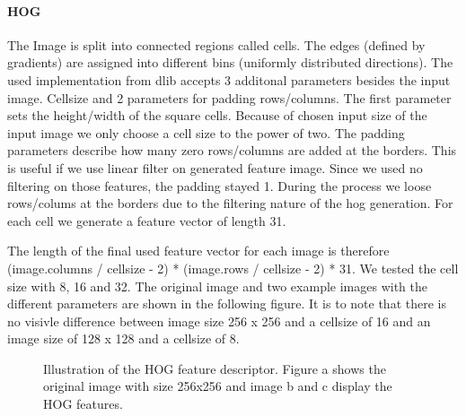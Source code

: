 \documentclass[a4paper,10pt]{article}
\begin{document}
\paragraph{HOG} 
The Image is split into connected regions called cells. The edges (defined by gradients) are assigned into different bins (uniformly distributed directions).
The used implementation from dlib accepts 3 additonal parameters besides the input image.
Cellsize and 2 parameters for padding rows/columns. The first parameter sets the height/width of the square cells. 
Because of chosen input size of the input image we only choose a cell size to the power of two.
The padding parameters describe how many zero rows/columns are added at the borders. This is useful if we use linear filter on generated feature image.
Since we used no filtering on those features, the padding stayed 1. During the process we loose rows/colums at the borders due to the filtering nature of the hog generation.
For each cell we generate a feature vector of length 31.

The length of the final used feature vector for each image is therefore (image.columns / cellsize - 2)  * (image.rows / cellsize - 2) * 31.
We tested the cell size with 8, 16 and 32.
The original image and two example images with the different parameters are shown in the following figure.
It is to note that there is no visivle difference between image size 256 x 256 and a cellsize of 16 and an image size of 128 x 128 and a cellsize of 8.

\begin{figure} [htb]
\centering
{} 
\caption{Illustration of the HOG feature descriptor. Figure a shows the original image with size 256x256 and image b and c display the HOG features.}
\label{fig:hog}
\end{figure}
\end{document}
